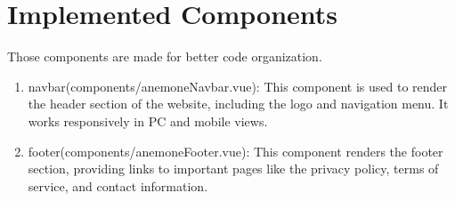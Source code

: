 
\section{Implemented Components}
Those components are made for better code organization.
\begin{enumerate}
	\item navbar(components/anemoneNavbar.vue): This component is used to render the header section of the website, including the logo and navigation menu. It works responsively in PC and mobile views.
	\item footer(components/anemoneFooter.vue): This component renders the footer section, providing links to important pages like the privacy policy, terms of service, and contact information.
\end{enumerate}